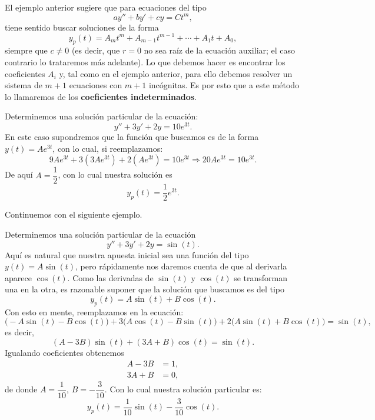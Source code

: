 \begin{remark}
    El ejemplo anterior sugiere que para ecuaciones del tipo
    \[
    ay''+by'+cy=Ct^m,
    \]
    tiene sentido buscar soluciones de la forma
    \[
    y_p(t)=A_mt^m+A_{m-1}t^{m-1}+\cdots+A_1t+A_0,
    \]
    siempre que $c\neq 0$ (es decir, que $r=0$ no sea ra\'iz de la ecuaci\'on auxiliar; el caso contrario lo trataremos m\'as adelante). Lo que debemos hacer es encontrar los coeficientes $A_i$ y, tal como en el ejemplo anterior, para ello debemos resolver un sistema de $m+1$ ecuaciones con $m+1$ inc\'ognitas. Es por esto que a este m\'etodo lo llamaremos de los \textbf{coeficientes indeterminados}.
\end{remark}

\begin{example}
    Determinemos una soluci\'on particular de la ecuaci\'on:
    \[
    y''+3y'+2y=10e^{3t}.
    \]
    En este caso supondremos que la funci\'on que buscamos es de la forma $y(t)=Ae^{3t}$, con lo cual, si reemplazamos:
    \[
    9Ae^{3t}+3(3Ae^{3t})+2(Ae^{3t})=10e^{3t}\Longrightarrow 20Ae^{3t}=10e^{3t}.
    \]
    De aqu\'i $A=\dfrac{1}{2}$, con lo cual nuestra soluci\'on es
    \[
    y_p(t)=\dfrac{1}{2}e^{3t}.
    \]
\end{example}

Continuemos con el siguiente ejemplo.

\begin{example}
    Determinemos una soluci\'on particular de la ecuaci\'on
    \[
    y''+3y'+2y=\sin(t).
    \]
    Aqu\'i es natural que nuestra apuesta inicial sea una funci\'on del tipo $y(t)=A\sin(t)$, pero r\'apidamente nos daremos cuenta de que al derivarla aparece $\cos(t)$. Como las derivadas de $\sin(t)$ y $\cos(t)$ se transforman una en la otra, es razonable suponer que la soluci\'on que buscamos es del tipo
    \[
    y_p(t)=A\sin(t)+B\cos(t).
    \]
    Con esto en mente, reemplazamos en la ecuaci\'on:
    \[
    \big(-A\sin(t)-B\cos(t)\big)+3\big(A\cos(t)-B\sin(t)\big)+2\big(A\sin(t)+B\cos(t)\big)=\sin(t),
    \]
    es decir,
    \[
    (A-3B)\sin(t)+(3A+B)\cos(t)=\sin(t).
    \]
    Igualando coeficientes obtenemos
    \begin{align*}
        A-3B&=1,\\
        3A+B&=0,
    \end{align*}
    de donde $A=\dfrac{1}{10}$, $B=-\dfrac{3}{10}$. Con lo cual nuestra soluci\'on particular es:
    \[
    y_p(t)=\dfrac{1}{10}\sin(t)-\dfrac{3}{10}\cos(t).
    \]
\end{example}

